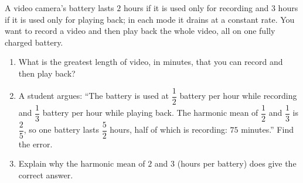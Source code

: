 A video camera's battery lasts $2$ hours if it is used only for recording and $3$ hours if it is used only for playing back; in each mode it drains at a constant rate. You want to record a video and then play back the whole video, all on one fully charged battery.
\begin{enumerate}
\item[(a)] What is the greatest length of video, in minutes, that you can record and then play back?
\item[(b)] A student argues: ``The battery is used at $\dfrac{1}{2}$ battery per hour while recording and $\dfrac{1}{3}$ battery per hour while playing back. The harmonic mean of $\dfrac{1}{2}$ and $\dfrac{1}{3}$ is $\dfrac{2}{5}$, so one battery lasts $\dfrac{5}{2}$ hours, half of which is recording: $75$ minutes.'' Find the error.
\item[(c)] Explain why the harmonic mean of $2$ and $3$ (hours per battery) does give the correct answer.
\end{enumerate}
